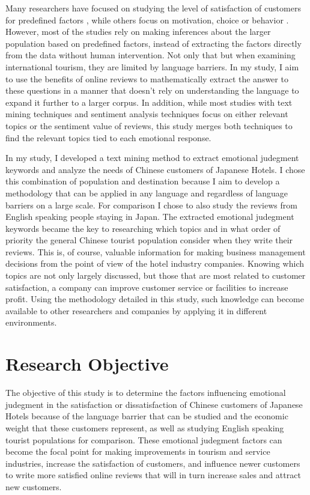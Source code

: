 \documentclass[review]{elsarticle}
\begin{document}
Many researchers have focused on studying the level of satisfaction of customers for predefined factors \cite[e.g.][]{balbi2018, kim2017362, truong2009, wu2009, shanka2004, kozak2002}, while others focus on motivation, choice or behavior \cite[e.g.][]{chang2008, romao2014, dongyang2015}. However, most of the studies rely on making inferences about the larger population based on predefined factors, instead of extracting the factors directly from the data without human intervention. Not only that but when examining international tourism, they are limited by language barriers. In my study, I aim to use the benefits of online reviews to mathematically extract the answer to these questions in a manner that doesn't rely on understanding the language to expand it further to a larger corpus. In addition, while most studies with text mining techniques and sentiment analysis techniques focus on either relevant topics or the sentiment value of reviews, this study merges both techniques to find the relevant topics tied to each emotional response.

In my study, I developed a text mining method to extract emotional judegment keywords and analyze the needs of Chinese customers of Japanese Hotels. I chose this combination of population and destination because I aim to develop a methodology that can be applied in any language and regardless of language barriers on a large scale. For comparison I chose to also study the reviews from English speaking people staying in Japan. The extracted emotional judegment keywords became the key to researching which topics and in what order of priority the general Chinese tourist population consider when they write their reviews. This is, of course, valuable information for making business management decisions from the point of view of the hotel industry companies. Knowing which topics are not only largely discussed, but those that are most related to customer satisfaction, a company can improve customer service or facilities to increase profit. Using the methodology detailed in this study, such knowledge can become available to other researchers and companies by applying it in different environments.

\section{Research Objective}\label{research_objective}

The objective of this study is to determine the factors influencing emotional judegment in the satisfaction or dissatisfaction of Chinese customers of Japanese Hotels because of the language barrier that can be studied and the economic weight that these customers represent, as well as studying English speaking tourist populations for comparison. These emotional judegment factors can become the focal point for making improvements in tourism and service industries, increase the satisfaction of customers, and influence newer customers to write more satisfied online reviews that will in turn increase sales and attract new customers. 
\end{document}
